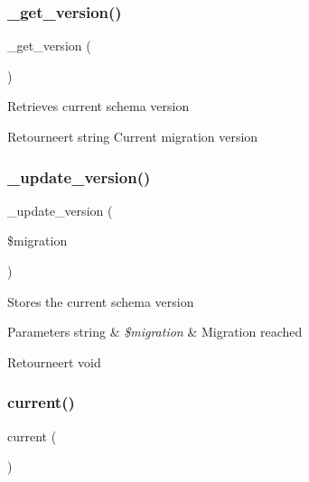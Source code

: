 \subsubsection{\texorpdfstring{\_get\_version()}{\_get\_version()}}
{\footnotesize\ttfamily \+\_\+get\+\_\+version (\begin{DoxyParamCaption}{ }\end{DoxyParamCaption})\hspace{0.3cm}{\ttfamily [protected]}}

Retrieves current schema version

\begin{DoxyReturn}{Retourneert}
string Current migration version 
\end{DoxyReturn}
\mbox{\label{class_c_i___migration_a6eb30e31b93e1cf882527be723d52fcd}} 
\subsubsection{\texorpdfstring{\_update\_version()}{\_update\_version()}}
{\footnotesize\ttfamily \+\_\+update\+\_\+version (\begin{DoxyParamCaption}\item[{}]{\$migration }\end{DoxyParamCaption})\hspace{0.3cm}{\ttfamily [protected]}}

Stores the current schema version


\begin{DoxyParams}[1]{Parameters}
string & {\em \$migration} & Migration reached \\
\hline
\end{DoxyParams}
\begin{DoxyReturn}{Retourneert}
void 
\end{DoxyReturn}
\mbox{\label{class_c_i___migration_af343507d1926e6ecf964625d41db528c}} 
\subsubsection{\texorpdfstring{current()}{current()}}
{\footnotesize\ttfamily current (\begin{DoxyParamCaption}{ }\end{DoxyParamCaption})}

